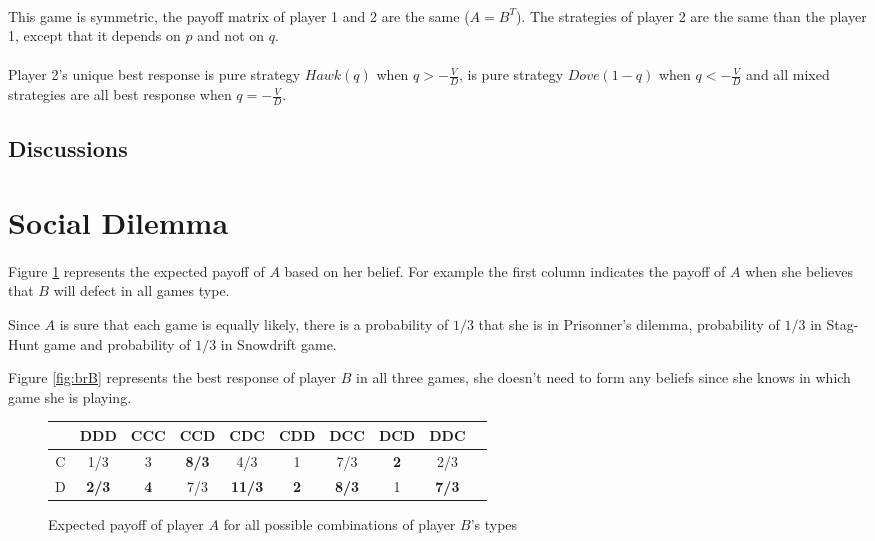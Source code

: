 \documentclass[letterpaper]{article}
\begin{document}
\paragraph{}

This game is symmetric, the payoff matrix of player 1 and 2 are the same
($A = B^T$). The strategies of player 2 are the same than the player 1, except
that it depends on $p$ and not on $q$.
\paragraph{}

Player 2's unique best response is pure strategy $Hawk(q)$
when $q > -\frac{V}{D}$,  is pure strategy $Dove(1 - q)$ when
$q < -\frac{V}{D}$ and all mixed strategies are all best response when
$q = -\frac{V}{D}$.

\subsection{Discussions}


\section{Social Dilemma}


\paragraph{}

Figure \ref{fig:brA} represents the expected payoff of $A$ based on her
belief. For example the first column indicates the payoff of $A$ when she
believes that $B$ will defect in all games type.

Since $A$ is sure that each game is equally likely, there is a probability of
$1/3$ that she is in Prisonner's dilemma,
probability of $1/3$ in Stag-Hunt game and probability of $1/3$ in Snowdrift
game.

Figure \ref{fig:brB} represents the best response of player $B$ in all three
games, she doesn't need to form any beliefs since she knows in which game
she is playing.

\begin{figure}[!ht]

\begin{center}
\begin{tabular}{|c|c|c|c|c|c|c|c|c|c|}
    \hline
    & DDD & CCC & CCD & CDC & CDD & DCC & DCD & DDC \\
    \hline
    C & 1/3 & 3 & \textbf{8/3} & 4/3 & 1 & 7/3 & \textbf{\color{red}2} & 2/3 \\
    \hline
    D & \textbf{2/3} & \textbf{4} & 7/3 & \textbf{11/3}
    & \textbf{2} & \textbf{8/3} & 1 & \textbf{\color{red}7/3} \\
    \hline
\end{tabular}
\end{center}

\caption{Expected payoff of player $A$ for all possible combinations of
player $B$’s types}
\label{fig:brA}
\end{figure}
\end{document}
